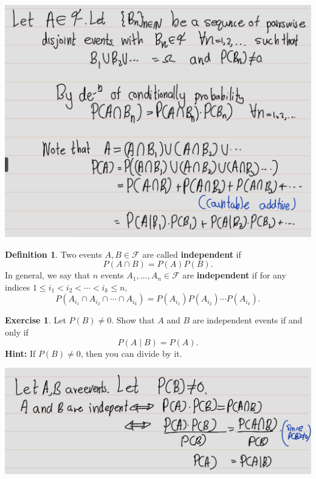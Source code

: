 \documentclass[
]{book}
\theoremstyle{definition}
\newtheorem{definition}{Definition}[chapter]
\theoremstyle{definition}
\theoremstyle{definition}
\newtheorem{exercise}{Exercise}[chapter]
\theoremstyle{definition}
\theoremstyle{remark}
\begin{document}
\includegraphics[width=18cm,height=\textheight]{fig/fig ex1.10.png}

\begin{definition}
\protect\hypertarget{def:unnamed-chunk-30}{}\label{def:unnamed-chunk-30}Two events \(A, B \in \mathcal{F}\) are called \textbf{independent} if
\[
P(A \cap B) = P(A)P(B).
\]
In general, we say that \(n\) events \(A_1, \ldots, A_n \in \mathcal{F}\) are \textbf{independent} if for any indices \(1 \leq i_1 < i_2 < \cdots < i_k \leq n\),
\[
P(A_{i_1} \cap A_{i_2} \cap \cdots \cap A_{i_k}) = P(A_{i_1})P(A_{i_2}) \cdots P(A_{i_k}).
\]
\end{definition}

\begin{exercise}
\protect\hypertarget{exr:unnamed-chunk-31}{}\label{exr:unnamed-chunk-31}Let \(P(B) \neq 0\). Show that \(A\) and \(B\) are independent events if and only if
\[
P(A \mid B) = P(A).
\]
\textbf{Hint:} If \(P(B) \neq 0\), then you can divide by it.
\end{exercise}

\includegraphics[width=18cm,height=\textheight]{fig/fig ex1.11.png}
\end{document}
